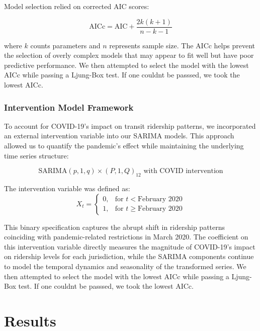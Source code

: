 \documentclass[11pt]{article}
\begin{document}
Model selection relied on corrected AIC scores:

\begin{equation}
\text{AICc} = \text{AIC} + \frac{2k(k+1)}{n-k-1}
\end{equation}

where $k$ counts parameters and $n$ represents sample size. The AICc helps prevent the selection of overly complex models that may appear to fit well but have poor predictive performance. We then attempted to select the model with the lowest AICc while passing a Ljung-Box test. If one couldnt be passsed, we took the lowest AICc. 

\subsubsection{Intervention Model Framework}

To account for COVID-19's impact on transit ridership patterns, we incorporated an external intervention variable into our SARIMA models. This approach allowed us to quantify the pandemic's effect while maintaining the underlying time series structure:

\begin{equation}
\text{SARIMA}(p,1,q) \times (P,1,Q)_{12} \text{ with COVID intervention}
\end{equation}

The intervention variable was defined as:
\begin{equation}
X_t = \begin{cases}
0, & \text{for } t < \text{February 2020} \\
1, & \text{for } t \geq \text{February 2020}
\end{cases}
\end{equation}

This binary specification captures the abrupt shift in ridership patterns coinciding with pandemic-related restrictions in March 2020. The coefficient on this intervention variable directly measures the magnitude of COVID-19's impact on ridership levels for each jurisdiction, while the SARIMA components continue to model the temporal dynamics and seasonality of the transformed series. We then attempted to select the model with the lowest AICc while passing a Ljung-Box test. If one couldnt be passsed, we took the lowest AICc.

\section{Results}
\end{document}
